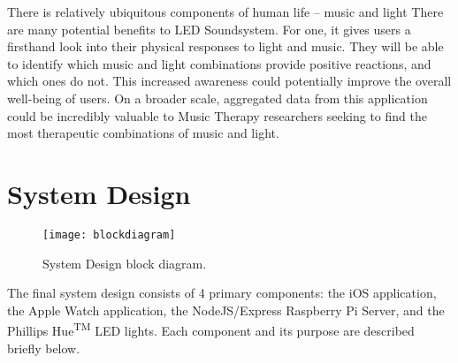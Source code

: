 \documentclass[11pt]{article}
\begin{document}
There is relatively  ubiquitous components of human life -- music and light 
There are many potential benefits to LED Soundsystem. For one, it gives users a firsthand look into their physical responses to light and music. They will be able to identify which music and light combinations provide positive reactions, and which ones do not. This increased awareness could potentially improve the overall well-being of users. On a broader scale, aggregated data from this application could be incredibly valuable to Music Therapy researchers seeking to find the most therapeutic combinations of music and light.

\section{System Design}

\begin{center}
\begin{figure}[ht]
\texttt{[image: blockdiagram]}
\caption{System Design block diagram.}
\end{figure}
\end{center}

The final system design consists of 4 primary components: the iOS application, the Apple Watch application, the NodeJS/Express Raspberry Pi Server, and the Phillips Hue\textsuperscript{TM} LED lights. Each component and its purpose are described briefly below.
\end{document}
